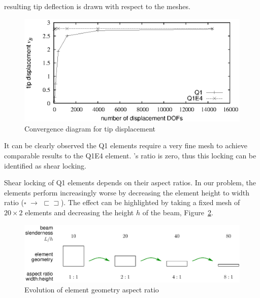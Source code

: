 resulting tip deflection is drawn with respect to the meshes. 
\begin{figure}[H]
  \begin{center}
    \includegraphics[width=0.8\linewidth]{eps/cant100-tipdispl}
  \end{center}
  \caption{Convergence diagram for tip displacement}
  \label{wall1:fig:eas-convergence-tip-displ-cantilever}
\end{figure}
It can be clearly observed the Q1 elements require a very fine mesh to achieve
comparable results to the Q1E4 element. 's ratio is zero,
thus this locking can be identified as shear locking.

Shear locking of Q1 elements depends on their aspect ratios. In our problem,
the elements perform increasingly worse by decreasing the element height to
width ratio ($\square$ $\to$ $\sqsubset\!\sqsupset$). The
effect can be highlighted by taking a fixed mesh of $20\times2$ elements and
decreasing the height $h$ of the beam, \cf{}
Figure~\ref{wall1:fig:eas-aspect-ratio-evolution}\@.  
\begin{figure}[H]
  \begin{center}
    \includegraphics[width=0.8\linewidth]{eps/cantv-evolution-aspect-ratio}
  \end{center}
  \caption{Evolution of element geometry aspect ratio}
  \label{wall1:fig:eas-aspect-ratio-evolution}
\end{figure}

